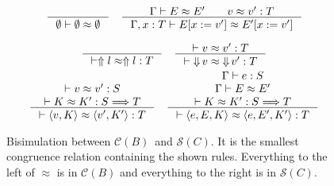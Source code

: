 \documentclass[runningheads]{llncs}
\newcommand{\infr}[2]{\inference{#1}{#2}}
\newcommand{\CMachine}[1]{\ensuremath{\mathcal{C}(#1)}}
\newcommand{\CBMachine}[0]{\CMachine{B}}
\newcommand{\SMachine}[1]{\ensuremath{\mathcal{S}(#1)}}
\newcommand{\error}[1]{\ensuremath{\Uparrow#1}}
\newcommand{\ecast}[2]{\ensuremath{#1 : #2}}
\newcommand{\ccast}[3]{#1 \xRightarrow[]{\enskip #2 \enskip} #3}
\newcommand{\sexpr}[3]{\ensuremath{\langle#1,#2,#3\rangle}}
\newcommand{\scont}[2]{\ensuremath{\langle#1,#2\rangle}}
\newcommand{\shalt}[1]{\ensuremath{\mathop{\Downarrow} #1}}
\newcommand{\Kcons}[2]{[#1]#2}
\newcommand{\Fcast}[1]{\ecast{\square}{#1}}
\newcommand{\compose}[2]{\ensuremath{#1 \fatsemi #2}}
\newcommand{\translate}[1]{\ensuremath{\lceil#1\rceil}}
\newcommand{\expressiontyping}[3]{\ensuremath{#1 \vdash #2 : #3}}
\newcommand{\valuetyping}[2]{\ensuremath{\vdash #1 : #2}}
\newcommand{\casttyping}[3]{\ensuremath{\vdash #1 : #2 \Longrightarrow #3}}
\newcommand{\bisimE}[3]{\ensuremath{#1 \vdash #2 \approx #3}}
\newcommand{\bisimv}[3]{\valuetyping{#1 \approx #2}{#3}}
\newcommand{\bisimc}[4]{\casttyping{#1 \approx #2}{#3}{#4}}
\newcommand{\bisimK}[4]{\casttyping{#1 \approx #2}{#3}{#4}}
\newcommand{\bisims}[3]{\valuetyping{\ensuremath{#1 \approx #2}}{#3}}
\begin{document}
\begin{figure}[tp]
\fbox{\bisimE{\Gamma}{E}{E}}
\begin{gather*}
\inference{
}{
	\bisimE{\emptyset}{\emptyset}{\emptyset}
}
\quad
\inference{
	\Gamma \vdash E \approx E' \qquad
	v \approx v' : T
}{
	\Gamma , x : T \vdash 
	E [ x := v' ] \approx E' [ x := v' ]
}
\end{gather*}

\fbox{\bisims{s}{s}{T}}
\begin{gather*}
\infr{}{\bisims{\error{l}}{\error{l}}{T}} \quad
\infr{
	\bisimv{v}{v'}{T}
}{
	\bisims{\shalt{v}}{\shalt{v'}}{T}
}
\\
\infr{
	\bisimv{v}{v'}{S} \\
	\bisimK{K}{K'}{S}{T}
}{
	\bisims{\scont{v}{K}}{\scont{v'}{K'}}{T}
} \quad
\infr{
	\expressiontyping{\Gamma}{e}{S} \\
	\bisimE{\Gamma}{E}{E'}          \\
	\bisimK{K}{K'}{S}{T}
}{
	\bisims{\sexpr{e}{E}{K}}{\sexpr{e}{E'}{K'}}{T}
}
\end{gather*}

\caption{Bisimulation between \CBMachine\ and \SMachine{C}. It is the
  smallest congruence relation containing the shown rules. Everything
  to the left of $\approx$ is in \CBMachine{} and everything to the
  right is in \SMachine{C}.}
\label{fig:bisim-SC-D}
\end{figure}



\end{document}
